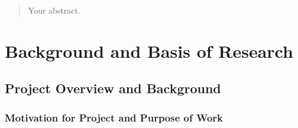 \documentclass[12pt,twoside]{report}
\date{September 2019}
\begin{document}



\clearpage{\pagestyle{empty}\cleardoublepage}
\setcounter{page}{1}
\pagestyle{fancy}

\begin{abstract}
Your abstract.
\end{abstract}

\clearpage


\tableofcontents 


\clearpage{\pagestyle{empty}\cleardoublepage}
\setcounter{page}{1}
\fancyhead[LE,RO]{\slshape \rightmark}
\fancyhead[LO,RE]{\slshape \leftmark}



















\part{Background and Basis of Research}


\chapter{Project Overview and Background\\}


\section{Motivation for Project and Purpose of Work}
\end{document}
